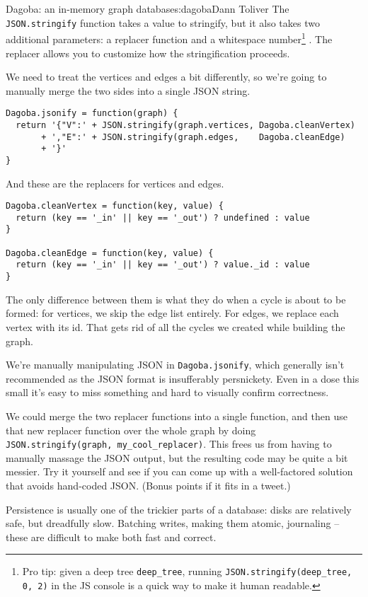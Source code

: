 \begin{aosachapter}{Dagoba: an in-memory graph database}{s:dagoba}{Dann Toliver}
The \texttt{JSON.stringify} function takes a value to stringify, but it
also takes two additional parameters: a replacer function and a
whitespace number\footnote{Pro tip: given a deep tree
  \texttt{deep\_tree}, running \texttt{JSON.stringify(deep\_tree, 0, 2)}
  in the JS console is a quick way to make it human readable.} . The
replacer allows you to customize how the stringification proceeds.

We need to treat the vertices and edges a bit differently, so we're
going to manually merge the two sides into a single JSON string.

\begin{verbatim}
Dagoba.jsonify = function(graph) {
  return '{"V":' + JSON.stringify(graph.vertices, Dagoba.cleanVertex)
       + ',"E":' + JSON.stringify(graph.edges,    Dagoba.cleanEdge)
       + '}' 
}
\end{verbatim}

And these are the replacers for vertices and edges.

\begin{verbatim}
Dagoba.cleanVertex = function(key, value) {
  return (key == '_in' || key == '_out') ? undefined : value 
}

Dagoba.cleanEdge = function(key, value) {
  return (key == '_in' || key == '_out') ? value._id : value 
}
\end{verbatim}

The only difference between them is what they do when a cycle is about
to be formed: for vertices, we skip the edge list entirely. For edges,
we replace each vertex with its id. That gets rid of all the cycles we
created while building the graph.

We're manually manipulating JSON in \texttt{Dagoba.jsonify}, which
generally isn't recommended as the JSON format is insufferably
persnickety. Even in a dose this small it's easy to miss something and
hard to visually confirm correctness.

We could merge the two replacer functions into a single function, and
then use that new replacer function over the whole graph by doing
\texttt{JSON.stringify(graph, my\_cool\_replacer)}. This frees us from
having to manually massage the JSON output, but the resulting code may
be quite a bit messier. Try it yourself and see if you can come up with
a well-factored solution that avoids hand-coded JSON. (Bonus points if
it fits in a tweet.)

\label{persistence}

Persistence is usually one of the trickier parts of a database: disks
are relatively safe, but dreadfully slow. Batching writes, making them
atomic, journaling -- these are difficult to make both fast and correct.


\end{aosachapter}

